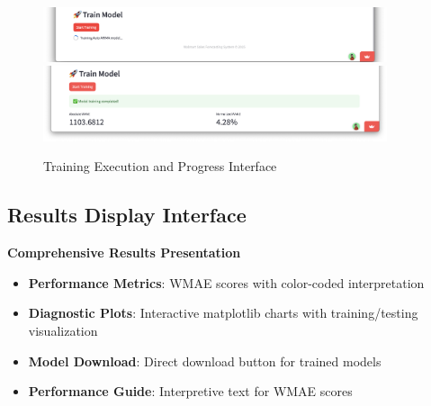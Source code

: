 \begin{figure}[H]
    \centering
   \includegraphics[width=0.9\textwidth]{Images/04GUIAndUserInterface/TrainingExecutionlnProgress.png}
     \includegraphics[width=0.9\textwidth]{Images/04GUIAndUserInterface/TrainingExecutionCompleted.png}
    \caption{Training Execution and Progress Interface}
    \label{fig:training_execution}
\end{figure}

\subsection{Results Display Interface}

\textbf{Comprehensive Results Presentation}

\begin{itemize}
    \item \textbf{Performance Metrics}: WMAE scores with color-coded interpretation
    \item \textbf{Diagnostic Plots}: Interactive matplotlib charts with training/testing visualization
    \item \textbf{Model Download}: Direct download button for trained models
    \item \textbf{Performance Guide}: Interpretive text for WMAE scores
\end{itemize}

